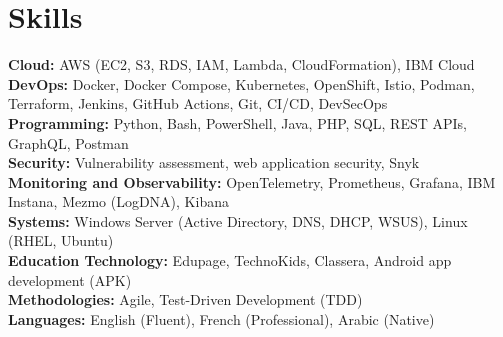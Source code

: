 \documentclass[a4paper,10pt]{article}
\begin{document}
\section*{Skills}
\textbf{Cloud:} AWS (EC2, S3, RDS, IAM, Lambda, CloudFormation), IBM Cloud\\
\textbf{DevOps:} Docker, Docker Compose, Kubernetes, OpenShift, Istio, Podman, Terraform, Jenkins, GitHub Actions, Git, CI/CD, DevSecOps\\
\textbf{Programming:} Python, Bash, PowerShell, Java, PHP, SQL, REST APIs, GraphQL, Postman\\
\textbf{Security:} Vulnerability assessment, web application security, Snyk\\
\textbf{Monitoring and Observability:} OpenTelemetry, Prometheus, Grafana, IBM Instana, Mezmo (LogDNA), Kibana\\
\textbf{Systems:} Windows Server (Active Directory, DNS, DHCP, WSUS), Linux (RHEL, Ubuntu)\\
\textbf{Education Technology:} Edupage, TechnoKids, Classera, Android app development (APK)\\
\textbf{Methodologies:} Agile, Test-Driven Development (TDD)\\
\textbf{Languages:} English (Fluent), French (Professional), Arabic (Native)
\end{document}
